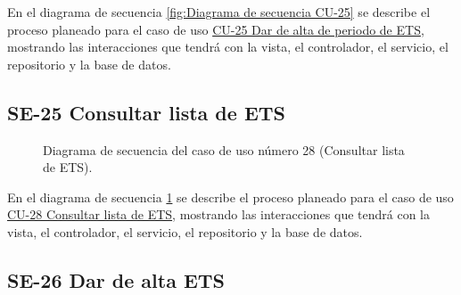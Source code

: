En el diagrama de secuencia \ref{fig:Diagrama de secuencia CU-25} se describe el proceso planeado para el caso de uso \hyperlink{CU-25}{CU-25 Dar de alta de periodo de ETS}, mostrando las interacciones que tendrá con la vista, el controlador, el servicio, el repositorio y la base de datos.

\newpage

\subsection{SE-25 Consultar lista de ETS}

\begin{figure}[htbp!]
	\begin{center}
		\caption{Diagrama de secuencia del caso de uso número 28 (Consultar lista de ETS).}
		\label{fig:Diagrama de secuencia CU-28}
	\end{center}
\end{figure}

En el diagrama de secuencia \ref{fig:Diagrama de secuencia CU-28} se describe el proceso planeado para el caso de uso \hyperlink{CU-28}{CU-28 Consultar lista de ETS}, mostrando las interacciones que tendrá con la vista, el controlador, el servicio, el repositorio y la base de datos.

\newpage

\subsection{SE-26 Dar de alta ETS}

